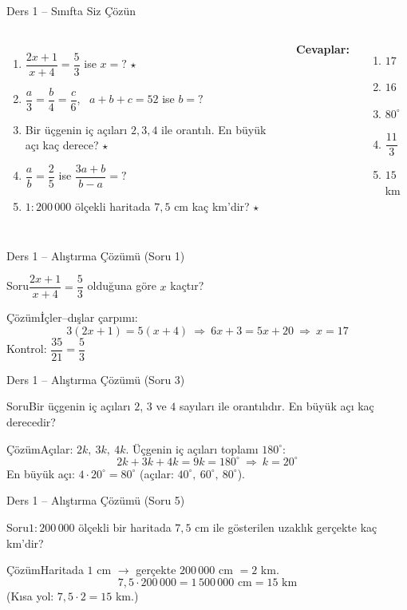 \documentclass[aspectratio=169,11pt]{beamer}
\newcommand{\soru}[3]{%
\begin{frame}{#1}
  \begin{block}{Soru}\large #2\end{block}
  \pause
  \begin{exampleblock}{Çözüm}\large #3\end{exampleblock}
\end{frame}}
\begin{document}
\begin{frame}{Ders 1 -- Sınıfta Siz Çözün}
\begin{columns}[t]
\begin{enumerate}
\item \(\dfrac{2x+1}{x+4}=\dfrac{5}{3}\) ise \(x=?\) \(\star\)
\item \(\dfrac{a}{3}=\dfrac{b}{4}=\dfrac{c}{6}\), \ \(a+b+c=52\) ise \(b=?\)
\item Bir üçgenin iç açıları \(2,3,4\) ile orantılı. En büyük açı kaç derece? \(\star\)
\item \(\dfrac{a}{b}=\dfrac{2}{5}\) ise \(\dfrac{3a+b}{b-a}=?\)
\item \(1:200\,000\) ölçekli haritada \(7{,}5\) cm kaç km'dir? \(\star\)
\end{enumerate}
\pause
\textbf{Cevaplar:}
\begin{enumerate}
\item \(17\)
\item \(16\)
\item \(80^\circ\)
\item \(\dfrac{11}{3}\)
\item \(15\) km
\end{enumerate}
\end{columns}
\vspace{4pt}{\footnotesize \(\star\) işaretli soruların adım adım çözümü sonraki slaytlardadır.}
\end{frame}

\soru{Ders 1 -- Alıştırma Çözümü (Soru 1)}
{\(\dfrac{2x+1}{x+4}=\dfrac{5}{3}\) olduğuna göre \(x\) kaçtır?}
{İçler--dışlar çarpımı:
\[3(2x+1)=5(x+4)\ \Rightarrow\ 6x+3=5x+20\ \Rightarrow\ x=17\]
Kontrol: \(\dfrac{35}{21}=\dfrac{5}{3}\) \checkmark}

\soru{Ders 1 -- Alıştırma Çözümü (Soru 3)}
{Bir üçgenin iç açıları \(2\), \(3\) ve \(4\) sayıları ile orantılıdır. En büyük açı kaç derecedir?}
{Açılar: \(2k,\ 3k,\ 4k\). Üçgenin iç açıları toplamı \(180^\circ\):
\[2k+3k+4k=9k=180^\circ\ \Rightarrow\ k=20^\circ\]
En büyük açı: \(4\cdot 20^\circ=80^\circ\) \quad (açılar: \(40^\circ,\ 60^\circ,\ 80^\circ\)).}

\soru{Ders 1 -- Alıştırma Çözümü (Soru 5)}
{\(1:200\,000\) ölçekli bir haritada \(7{,}5\) cm ile gösterilen uzaklık gerçekte kaç km'dir?}
{Haritada \(1\) cm \(\rightarrow\) gerçekte \(200\,000\) cm \(=2\) km.
\[7{,}5\cdot 200\,000=1\,500\,000\text{ cm}=15\text{ km}\]
(Kısa yol: \(7{,}5\cdot 2=15\) km.)}
\end{document}
